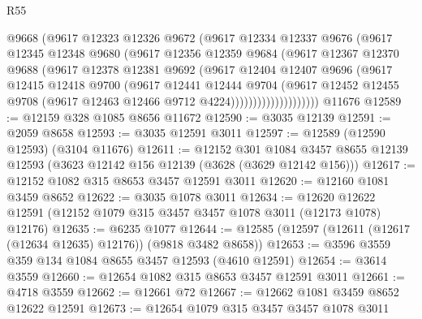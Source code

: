 \begin{lexlean}{R55}
\begin{coremodule}
                      @9668
                      (@9617
                        @12323
                        @12326
                        @9672
                        (@9617
                          @12334
                          @12337
                          @9676
                          (@9617
                            @12345
                            @12348
                            @9680
                            (@9617
                              @12356
                              @12359
                              @9684
                              (@9617
                                @12367
                                @12370
                                @9688
                                (@9617
                                  @12378
                                  @12381
                                  @9692
                                  (@9617
                                    @12404
                                    @12407
                                    @9696
                                    (@9617
                                      @12415
                                      @12418
                                      @9700
                                      (@9617
                                        @12441
                                        @12444
                                        @9704
                                        (@9617
                                          @12452
                                          @12455
                                          @9708
                                          (@9617 @12463 @12466 @9712 @4224))))))))))))))))))))
    @11676
@12589 := @12159 @328 @1085 @8656 @11672
@12590 := @3035 @12139
@12591 := @2059 @8658
@12593 := @3035 @12591 @3011
@12597 := @12589 (@12590 @12593) (@3104 @11676)
@12611 := @12152
    @301
    @1084
    @3457
    @8655
    @12139
    @12593
    (@3623 @12142 @156 @12139 (@3628 (@3629 @12142 @156)))
@12617 := @12152 @1082 @315 @8653 @3457 @12591 @3011
@12620 := @12160 @1081 @3459 @8652
@12622 := @3035 @1078 @3011
@12634 := @12620 @12622 @12591 (@12152 @1079 @315 @3457 @3457 @1078 @3011 (@12173 @1078) @12176)
@12635 := @6235 @1077
@12644 := @12585 (@12597 (@12611 (@12617 (@12634 @12635) @12176)) (@9818 @3482 @8658))
@12653 := @3596 @3559 @359 @134 @1084 @8655 @3457 @12593 (@4610 @12591)
@12654 := @3614 @3559
@12660 := @12654 @1082 @315 @8653 @3457 @12591 @3011
@12661 := @4718 @3559
@12662 := @12661 @72
@12667 := @12662 @1081 @3459 @8652 @12622 @12591
@12673 := @12654 @1079 @315 @3457 @3457 @1078 @3011

\end{coremodule}
\end{lexlean}
